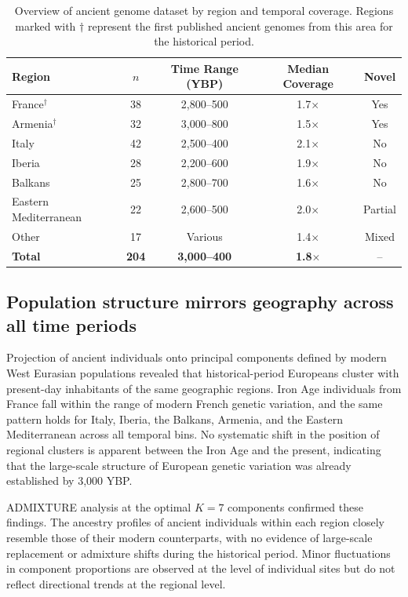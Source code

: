 \documentclass[11pt,a4paper]{article}
\begin{document}
\begin{table}[ht]
\centering
\caption{Overview of ancient genome dataset by region and temporal coverage. Regions marked with $\dagger$ represent the first published ancient genomes from this area for the historical period.}
\label{tab:samples}
\begin{tabular}{@{}lcccc@{}}
\toprule
\textbf{Region} & \textbf{$n$} & \textbf{Time Range (YBP)} & \textbf{Median Coverage} & \textbf{Novel} \\
\midrule
France$^\dagger$              & 38 & 2,800--500  & 1.7$\times$ & Yes \\
Armenia$^\dagger$             & 32 & 3,000--800  & 1.5$\times$ & Yes \\
Italy                         & 42 & 2,500--400  & 2.1$\times$ & No  \\
Iberia                        & 28 & 2,200--600  & 1.9$\times$ & No  \\
Balkans                       & 25 & 2,800--700  & 1.6$\times$ & No  \\
Eastern Mediterranean         & 22 & 2,600--500  & 2.0$\times$ & Partial \\
Other                         & 17 & Various     & 1.4$\times$ & Mixed \\
\midrule
\textbf{Total}                & \textbf{204} & \textbf{3,000--400} & \textbf{1.8$\times$} & -- \\
\bottomrule
\end{tabular}
\end{table}

\subsection{Population structure mirrors geography across all time periods}
Projection of ancient individuals onto principal components defined by modern West Eurasian populations revealed that historical-period Europeans cluster with present-day inhabitants of the same geographic regions. Iron Age individuals from France fall within the range of modern French genetic variation, and the same pattern holds for Italy, Iberia, the Balkans, Armenia, and the Eastern Mediterranean across all temporal bins. No systematic shift in the position of regional clusters is apparent between the Iron Age and the present, indicating that the large-scale structure of European genetic variation was already established by 3,000 YBP.

ADMIXTURE analysis at the optimal $K = 7$ components confirmed these findings. The ancestry profiles of ancient individuals within each region closely resemble those of their modern counterparts, with no evidence of large-scale replacement or admixture shifts during the historical period. Minor fluctuations in component proportions are observed at the level of individual sites but do not reflect directional trends at the regional level.
\end{document}
